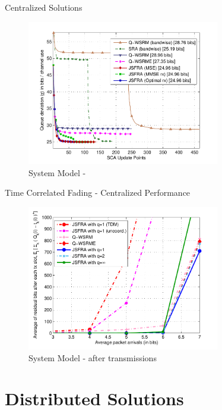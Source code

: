 \documentclass[9pt]{beamer}
\begin{document}
\begin{frame}{Centralized Solutions}
	\begin{figure}
		\centering
		\includegraphics[width=0.75\textwidth]{fig-2-5}
		\caption{System Model - }
	\end{figure}
\end{frame}

\begin{frame}{Time Correlated Fading - Centralized Performance}
	\begin{figure}
		\centering
		\includegraphics[width=0.75\textwidth]{average_queue_over_time-3}
		\caption{System Model -  after  transmissions}
	\end{figure}
\end{frame}

\section{Distributed Solutions}
\end{document}
